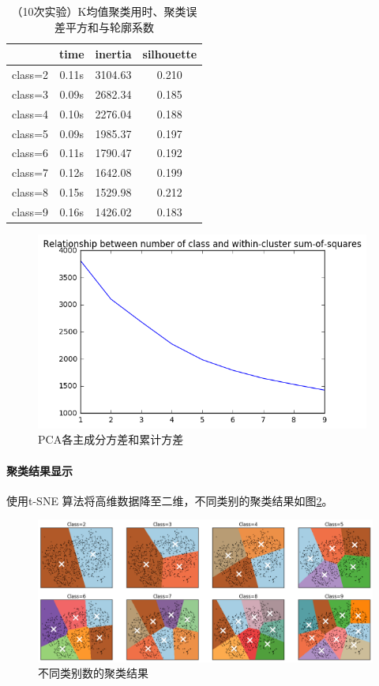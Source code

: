 \begin{table}[htbp]
\centering
\begin{tabular}{cccc}
\toprule
{} &   time &  inertia & silhouette \\
\midrule
class=2 &  0.11s &  3104.63 &      0.210 \\
class=3 &  0.09s &  2682.34 &      0.185 \\
class=4 &  0.10s &  2276.04 &      0.188 \\
class=5 &  0.09s &  1985.37 &      0.197 \\
class=6 &  0.11s &  1790.47 &      0.192 \\
class=7 &  0.12s &  1642.08 &      0.199 \\
class=8 &  0.15s &  1529.98 &      0.212 \\
class=9 &  0.16s &  1426.02 &      0.183 \\
\bottomrule
\end{tabular}
\caption{（10次实验）K均值聚类用时、聚类误差平方和与轮廓系数}
\label{tab:kmeans}
\end{table}

\begin{figure}
\centering
\includegraphics[width=11cm]{resource/class.png}
\caption{{\ttfamily PCA}各主成分方差和累计方差}
\label{fig:class}
\end{figure}

\paragraph{聚类结果显示} 使用{\ttfamily t-SNE} 算法将高维数据降至二维，不同类别的聚类结果如图\ref{fig:kmeans}。

\begin{figure}
\centering
\includegraphics[width=15cm]{resource/k_means.png}
\caption{不同类别数的聚类结果}
\label{fig:kmeans}
\end{figure}

